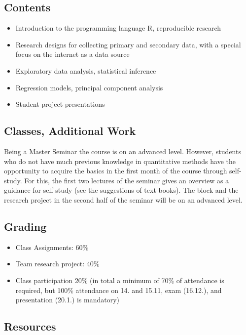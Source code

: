 \documentclass[]{article}
\begin{document}
\subsection{Contents}\label{contents}

\begin{itemize}
\itemsep1pt\parskip0pt
\item
  Introduction to the programming language R, reproducible research
\item
  Research designs for collecting primary and secondary data, with a
  special focus on the internet as a data source
\item
  Exploratory data analysis, statistical inference
\item
  Regression models, principal component analysis
\item
  Student project presentations
\end{itemize}

\subsection{Classes, Additional Work}\label{classes-additional-work}

Being a Master Seminar the course is on an advanced level. However,
students who do not have much previous knowledge in quantitative methods
have the opportunity to acquire the basics in the first month of the
course through self-study. For this, the first two lectures of the
seminar gives an overview as a guidance for self study (see the
suggestions of text books). The block and the research project in the
second half of the seminar will be on an advanced level.

\subsection{Grading}\label{grading}

\begin{itemize}
\itemsep1pt\parskip0pt
\item
  Class Assignments: 60\%
\item
  Team research project: 40\%
\item
  Class participation 20\% (in total a minimum of 70\% of attendance is
  required, but 100\% attendance on 14. and 15.11, exam (16.12.), and
  presentation (20.1.) is mandatory)
\end{itemize}

\subsection{Resources}\label{resources}
\end{document}
